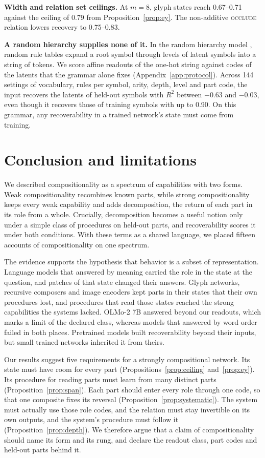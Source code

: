 \documentclass[10pt]{article}
\theoremstyle{plain}
\theoremstyle{remark}
\begin{document}
\textbf{Width and relation set ceilings.} At $m = 8$, glyph states reach 0.67--0.71 against the ceiling of 0.79 from Proposition~\ref{prop:ey}. The non-additive \textsc{occlude} relation lowers recovery to 0.75--0.83.

\textbf{A random hierarchy supplies none of it.} In the random hierarchy model \citep{cagnetta2024rhm}, random rule tables expand a root symbol through levels of latent symbols into a string of tokens. We score affine readouts of the one-hot string against codes of the latents that the grammar alone fixes (Appendix~\ref{app:protocol}). Across 144 settings of vocabulary, rules per symbol, arity, depth, level and part code, the input recovers the latents of held-out symbols with $R^2$ between $-0.63$ and $-0.03$, even though it recovers those of training symbols with up to 0.90. On this grammar, any recoverability in a trained network's state must come from training.

\section{Conclusion and limitations}
\label{sec:discussion}

We described compositionality as a spectrum of capabilities with two forms. Weak compositionality recombines known parts, while strong compositionality keeps every weak capability and adds decomposition, the return of each part in its role from a whole. Crucially, decomposition becomes a useful notion only under a simple class of procedures on held-out parts, and recoverability scores it under both conditions. With these terms as a shared language, we placed fifteen accounts of compositionality on one spectrum.

The evidence supports the hypothesis that behavior is a subset of representation. Language models that answered by meaning carried the role in the state at the question, and patches of that state changed their answers. Glyph networks, recursive composers and image encoders kept parts in their states that their own procedures lost, and procedures that read those states reached the strong capabilities the systems lacked. OLMo-2 7B answered beyond our readouts, which marks a limit of the declared class, whereas models that answered by word order failed in both places. Pretrained models built recoverability beyond their inputs, but small trained networks inherited it from theirs.

Our results suggest five requirements for a strongly compositional network. Its state must have room for every part (Propositions~\ref{prop:ceiling} and~\ref{prop:ey}). Its procedure for reading parts must learn from many distinct parts (Proposition~\ref{prop:span}). Each part should enter every role through one code, so that one composite fixes its reversal (Proposition~\ref{prop:systematic}). The system must actually use those role codes, and the relation must stay invertible on its own outputs, and the system's procedure must follow it (Proposition~\ref{prop:depth}). We therefore argue that a claim of compositionality should name its form and its rung, and declare the readout class, part codes and held-out parts behind it.
\end{document}
